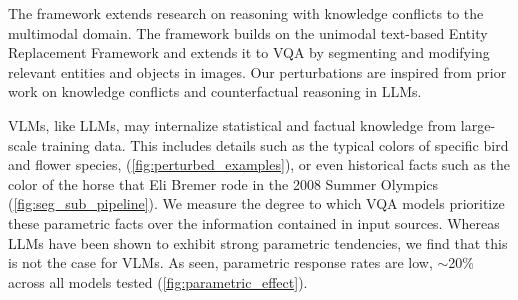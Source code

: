 



The \segsub framework extends research on reasoning with knowledge conflicts to the multimodal domain. The framework builds on the unimodal text-based Entity Replacement Framework \citep{longpre_entity-based_2022} and extends it to VQA by segmenting and modifying relevant entities and objects in images. Our perturbations are inspired from prior work on knowledge conflicts \citep{chen_rich_2022,longpre_entity-based_2022} and counterfactual reasoning \citep{neeman_disentqa_2022,hong_why_2024} in LLMs. 

VLMs, like LLMs, may internalize statistical and factual knowledge from large-scale training data. This includes details such as the typical colors of specific bird and flower species, (\autoref{fig:perturbed_examples}), or even historical facts such as the color of the horse that Eli Bremer rode in the 2008 Summer Olympics (\autoref{fig:seg_sub_pipeline}). We measure the degree to which VQA models prioritize these parametric facts over the information contained in input sources. Whereas LLMs have been shown to exhibit strong parametric tendencies, we find that this is not the case for VLMs. As seen, parametric response rates are low, $\sim$20\% across all models tested (\autoref{fig:parametric_effect}). 


